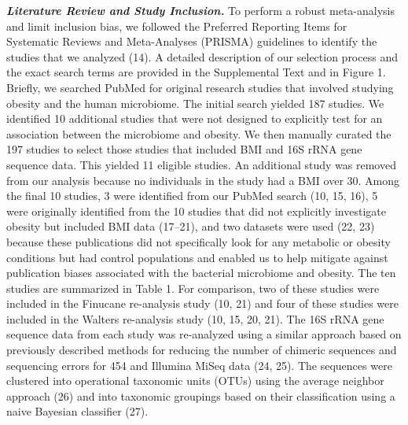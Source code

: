 \documentclass[12pt,]{article}
\begin{document}
\textbf{\emph{Literature Review and Study Inclusion.}} To perform a
robust meta-analysis and limit inclusion bias, we followed the Preferred
Reporting Items for Systematic Reviews and Meta-Analyses (PRISMA)
guidelines to identify the studies that we analyzed (14). A detailed
description of our selection process and the exact search terms are
provided in the Supplemental Text and in Figure 1. Briefly, we searched
PubMed for original research studies that involved studying obesity and
the human microbiome. The initial search yielded 187 studies. We
identified 10 additional studies that were not designed to explicitly
test for an association between the microbiome and obesity. We then
manually curated the 197 studies to select those studies that included
BMI and 16S rRNA gene sequence data. This yielded 11 eligible studies.
An additional study was removed from our analysis because no individuals
in the study had a BMI over 30. Among the final 10 studies, 3 were
identified from our PubMed search (10, 15, 16), 5 were originally
identified from the 10 studies that did not explicitly investigate
obesity but included BMI data (17--21), and two datasets were used (22,
23) because these publications did not specifically look for any
metabolic or obesity conditions but had control populations and enabled
us to help mitigate against publication biases associated with the
bacterial microbiome and obesity. The ten studies are summarized in
Table 1. For comparison, two of these studies were included in the
Finucane re-analysis study (10, 21) and four of these studies were
included in the Walters re-analysis study (10, 15, 20, 21). The 16S rRNA
gene sequence data from each study was re-analyzed using a similar
approach based on previously described methods for reducing the number
of chimeric sequences and sequencing errors for 454 and Illumina MiSeq
data (24, 25). The sequences were clustered into operational taxonomic
units (OTUs) using the average neighbor approach (26) and into taxonomic
groupings based on their classification using a naive Bayesian
classifier (27).
\end{document}

